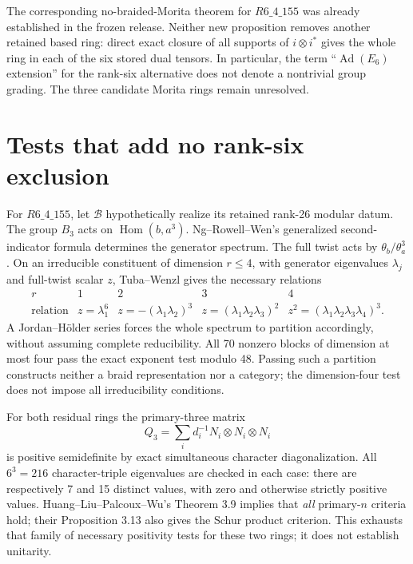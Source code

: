 \documentclass[10pt]{article}
\begin{document}
The corresponding no-braided-Morita theorem for $R6\_4\_155$ was already established in the frozen release. Neither new proposition removes another retained based ring: direct exact closure of all supports of $i\otimes i^*$ gives the whole ring in each of the six stored dual tensors. In particular, the term ``$\operatorname{Ad}(E_6)$ extension'' for the rank-six alternative does not denote a nontrivial group grading. The three candidate Morita rings remain unresolved.

\section{Tests that add no rank-six exclusion}
For $R6\_4\_155$, let $\mathcal B$ hypothetically realize its retained rank-26 modular datum. The group $B_3$ acts on $\operatorname{Hom}(b,a^3)$. Ng--Rowell--Wen's generalized second-indicator formula determines the generator spectrum. The full twist acts by $\theta_b/\theta_a^3$. On an irreducible constituent of dimension $r\le4$, with generator eigenvalues $\lambda_j$ and full-twist scalar $z$, Tuba--Wenzl gives the necessary relations
\[
 \begin{array}{c|cccc}
 r&1&2&3&4\\ \hline
 \text{relation}&z=\lambda_1^6&z=-(\lambda_1\lambda_2)^3&
 z=(\lambda_1\lambda_2\lambda_3)^2&z^2=(\lambda_1\lambda_2\lambda_3\lambda_4)^3.
 \end{array}
\]
A Jordan--H\"older series forces the whole spectrum to partition accordingly, without assuming complete reducibility. All 70 nonzero blocks of dimension at most four pass the exact exponent test modulo 48. Passing such a partition constructs neither a braid representation nor a category; the dimension-four test does not impose all irreducibility conditions.

For both residual rings the primary-three matrix
\[
 Q_3=\sum_i d_i^{-1}N_i\otimes N_i\otimes N_i
\]
is positive semidefinite by exact simultaneous character diagonalization. All $6^3=216$ character-triple eigenvalues are checked in each case: there are respectively 7 and 15 distinct values, with zero and otherwise strictly positive values. Huang--Liu--Palcoux--Wu's Theorem 3.9 implies that \emph{all} primary-$n$ criteria hold; their Proposition 3.13 also gives the Schur product criterion. This exhausts that family of necessary positivity tests for these two rings; it does not establish unitarity.
\end{document}
